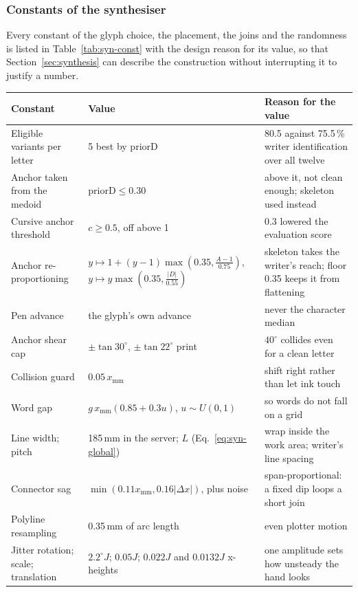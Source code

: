 \subsubsection{Constants of the synthesiser}

Every constant of the glyph choice, the placement, the joins and the randomness is listed in Table~\ref{tab:syn-const} with the design reason for its value, so that Section~\ref{sec:synthesis} can describe the construction without interrupting it to justify a number.

\begin{table}[!htbp]
\centering
\fontsize{8}{9.6}\selectfont
\setlength{\tabcolsep}{4pt}
\begin{tabularx}{\linewidth}{|p{3.5cm}|p{3.2cm}|X|}
\hline
\textbf{Constant} & \textbf{Value} & \textbf{Reason for the value} \\
\hline
Eligible variants per letter & 5 best by $\mathrm{priorD}$ & 80.5 against 75.5\,\% writer identification over all twelve \\
Anchor taken from the medoid & $\mathrm{priorD}\le0.30$ & above it, not clean enough; skeleton used instead \\
Cursive anchor threshold & $c\ge0.5$, off above 1 & 0.3 lowered the evaluation score \\
Anchor re-proportioning & $y\mapsto1+(y-1)\max(0.35,\frac{A-1}{0.75})$, $y\mapsto y\max(0.35,\frac{|D|}{0.55})$ & skeleton takes the writer's reach; floor 0.35 keeps it from flattening \\
Pen advance & the glyph's own advance & never the character median \\
Anchor shear cap & $\pm\tan30^\circ$, $\pm\tan22^\circ$ print & $40^\circ$ collides even for a clean letter \\
Collision guard & $0.05\,x_{\mathrm{mm}}$ & shift right rather than let ink touch \\
Word gap & $g\,x_{\mathrm{mm}}(0.85+0.3u)$, $u\sim U(0,1)$ & so words do not fall on a grid \\
Line width; pitch & 185\,mm in the server; $L$ (Eq.~\ref{eq:syn-global}) & wrap inside the work area; writer's line spacing \\
Connector sag & $\min(0.11x_{\mathrm{mm}},0.16|\Delta x|)$, plus noise & span-proportional: a fixed dip loops a short join \\
Polyline resampling & 0.35\,mm of arc length & even plotter motion \\
Jitter rotation; scale; translation & $2.2^\circ J$; $0.05J$; $0.022J$ and $0.0132J$ x-heights & one amplitude sets how unsteady the hand looks \\

\end{tabularx}
\end{table}
